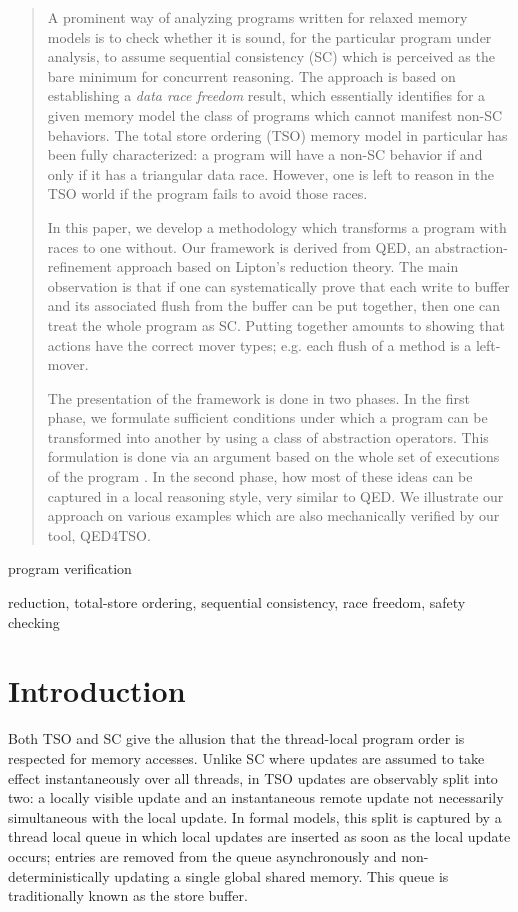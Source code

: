 \documentclass[preprint,9pt]{sigplanconf}
\begin{document}
\begin{abstract}
A prominent way of analyzing programs written for relaxed memory models is to check whether it is sound, for the particular program under analysis, to assume sequential consistency (SC) which is perceived as the bare minimum for concurrent reasoning.
The approach is based on establishing a {\em data race freedom} result, which essentially identifies for a given memory model the class of programs which cannot manifest non-SC behaviors.
The total store ordering (TSO) memory model in particular has been fully characterized: a program will have a non-SC behavior if and only if it has a triangular data race.
However, one is left to reason in the TSO world if the program fails to avoid those races.

In this paper, we develop a methodology which transforms a program with races to one without. 
Our framework is derived from QED, an abstraction-refinement approach based on Lipton's reduction theory.
The main observation is that if one can systematically prove that each write to buffer and its associated flush from the buffer can be put together, then one can treat the whole program as SC.
Putting together amounts to showing that actions have the correct mover types; e.g. each flush of a method is a left-mover.

The presentation of the framework is done in two phases.
In the first phase, we formulate sufficient conditions under which a program can be transformed into another by using a class of abstraction operators. 
This formulation is done via an argument based on the whole set of executions of the program .
In the second phase, how most of these ideas can be captured in a local reasoning style, very similar to QED.
We illustrate our approach on various examples which are also mechanically verified by our tool, QED4TSO.
\end{abstract}


\terms
program verification

\keywords
reduction, total-store ordering, sequential consistency, race freedom, safety checking 

\section{Introduction}
\label{sec:intro}
Both TSO and SC give the allusion that the thread-local program order is respected for memory accesses.
Unlike SC where updates are assumed to take effect instantaneously over all threads, in TSO updates are observably split into two: a locally visible update and an instantaneous remote update not necessarily simultaneous with the local update.
In formal models, this split is captured by a thread local queue in which local updates are inserted as soon as the local update occurs; entries are removed from the queue asynchronously and non-deterministically updating a single global shared memory. 
This queue is traditionally known as the store buffer.
\end{document}
